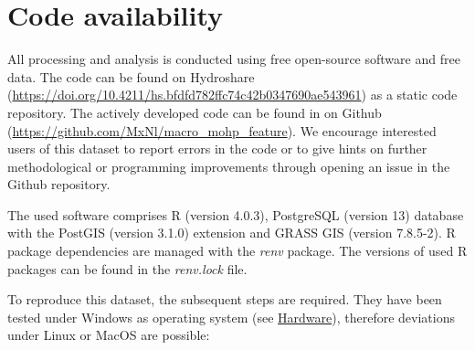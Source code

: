 \documentclass[fleqn,10pt]{wlscirep}
\begin{document}
\hypertarget{code-availability}{%
\section*{Code availability}\label{code-availability}}

All processing and analysis is conducted using free open-source software and free data.
The code\cite{nolscher_eu-mohp_2021} can be found on Hydroshare (\url{https://doi.org/10.4211/hs.bfdfd782ffc74c42b0347690ae543961}) as a static code repository.
The actively developed code can be found in on Github (\url{https://github.com/MxNl/macro_mohp_feature}). We encourage interested users of this dataset to report errors in the code or to give hints on further methodological or programming improvements through opening an issue in the Github repository.

The used software comprises R (version 4.0.3), PostgreSQL (version 13) database with the PostGIS (version 3.1.0) extension and GRASS GIS (version 7.8.5-2). R package dependencies are managed with the \emph{renv} package. The versions of used R packages can be found in the \emph{renv.lock} file.

To reproduce this dataset, the subsequent steps are required. They have been tested under Windows as operating system (see \protect\hyperlink{hardware}{Hardware}), therefore deviations under Linux or MacOS are possible:
\end{document}
